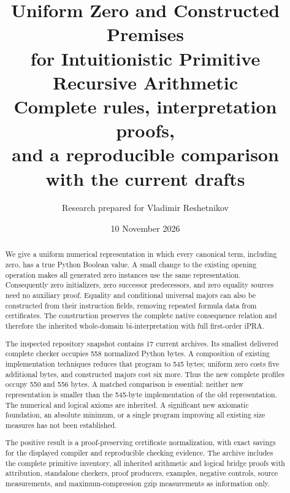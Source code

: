 \documentclass[11pt,letterpaper]{article}
\title{\color{ink}\bfseries Uniform Zero and Constructed Premises\\for Intuitionistic Primitive Recursive Arithmetic\\[7pt]
\large Complete rules, interpretation proofs,\\and a reproducible comparison with the current drafts}
\author{Research prepared for Vladimir Reshetnikov}
\date{10 November 2026}
\theoremstyle{definition}\newtheorem{definition}[theorem]{Definition}
\theoremstyle{remark}\newtheorem{remark}[theorem]{Remark}
\begin{document}
\maketitle
\begin{abstract}
We give a uniform numerical representation in which every canonical term,
including zero, has a true Python Boolean value. A small change to the
existing opening operation makes all generated zero instances use the same
representation. Consequently zero initializers, zero successor predecessors,
and zero equality sources need no auxiliary proof. Equality and conditional
universal majors can also be constructed from their instruction fields,
removing repeated formula data from certificates. The construction preserves
the complete native consequence relation and therefore the inherited
whole-domain bi-interpretation with full first-order iPRA.

The inspected repository snapshot contains 17 current archives. Its smallest
delivered complete checker occupies 558 normalized Python bytes. A composition
of existing implementation techniques reduces that program to 545 bytes;
uniform zero costs five additional bytes, and constructed majors cost six
more. Thus the new complete profiles occupy 550 and 556 bytes. A matched
comparison is essential: neither new representation is smaller than the
545-byte implementation of the old representation. The numerical and logical
axioms are inherited. A significant new axiomatic foundation, an absolute
minimum, or a single program improving all existing size measures has not
been established.

The positive result is a proof-preserving certificate normalization, with
exact savings for the displayed compiler and reproducible checking evidence.
The archive includes the complete primitive inventory, all inherited
arithmetic and logical bridge proofs with attribution, standalone checkers,
proof producers, examples, negative controls, source measurements, and
maximum-compression gzip measurements as information only.
\end{abstract}
\begin{center}
\end{center}
\clearpage
\setcounter{tocdepth}{1}\tableofcontents
\clearpage
\end{document}
